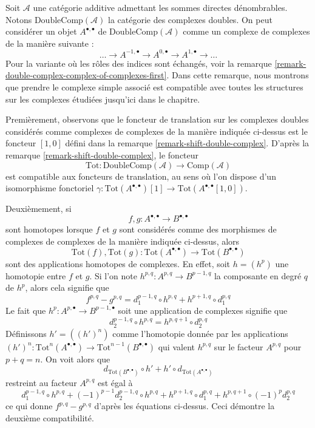 \begin{remark}
\label{remark-double-complex-complex-of-complexes-second}
Soit $\mathcal{A}$ une catégorie additive admettant les sommes directes dénombrables.
Notons $\text{DoubleComp}(\mathcal{A})$ la catégorie des complexes doubles.
On peut considérer un objet $A^{\bullet, \bullet}$ de
$\text{DoubleComp}(\mathcal{A})$ comme un complexe de complexes
de la manière suivante :
$$
\ldots \to A^{-1, \bullet} \to A^{0, \bullet} \to A^{1, \bullet} \to \ldots
$$
Pour la variante où les rôles des indices sont échangés, voir la
remarque \ref{remark-double-complex-complex-of-complexes-first}.
Dans cette remarque, nous montrons que prendre le complexe simple associé
est compatible avec toutes les structures sur les complexes étudiées
jusqu'ici dans le chapitre.

\medskip\noindent
Premièrement, observons que le foncteur de translation sur les complexes doubles considérés
comme complexes de complexes de la manière indiquée ci-dessus est le foncteur
$[1, 0]$ défini dans la remarque \ref{remark-shift-double-complex}.
D'après la remarque \ref{remark-shift-double-complex}, le foncteur
$$
\text{Tot} : \text{DoubleComp}(\mathcal{A}) \to \text{Comp}(\mathcal{A})
$$
est compatible aux foncteurs de translation, au sens où l'on dispose d'un isomorphisme
fonctoriel $\gamma : \text{Tot}(A^{\bullet, \bullet})[1] \to
\text{Tot}(A^{\bullet, \bullet}[1, 0])$.

\medskip\noindent
Deuxièmement, si
$$
f, g : A^{\bullet, \bullet} \to B^{\bullet, \bullet}
$$
sont homotopes lorsque $f$ et $g$ sont considérés comme des morphismes de complexes
de complexes de la manière indiquée ci-dessus, alors
$$
\text{Tot}(f), \text{Tot}(g) :
\text{Tot}(A^{\bullet, \bullet}) \to \text{Tot}(B^{\bullet, \bullet})
$$
sont des applications homotopes de complexes. En effet, soit $h = (h^p)$
une homotopie entre $f$ et $g$. Si l'on note
$h^{p, q} : A^{p, q} \to B^{p - 1, q}$ la composante en degré $q$ de $h^p$,
alors cela signifie que
$$
f^{p, q} - g^{p, q} = d_1^{p - 1, q} \circ h^{p, q} +
h^{p + 1, q} \circ d_1^{p, q}
$$
Le fait que $h^p : A^{p, \bullet} \to B^{p - 1, \bullet}$ soit une application de
complexes signifie que
$$
d_2^{p - 1, q} \circ h^{p, q} = h^{p, q + 1} \circ d_2^{p, q}
$$
Définissons $h' = ((h')^n)$ comme l'homotopie donnée par les applications
$(h')^n : \text{Tot}^n(A^{\bullet, \bullet}) \to
\text{Tot}^{n - 1}(B^{\bullet, \bullet})$
qui valent $h^{p, q}$ sur le facteur $A^{p, q}$ pour $p + q = n$.
On voit alors que
$$
d_{\text{Tot}(B^{\bullet, \bullet})} \circ h' +
h' \circ d_{\text{Tot}(A^{\bullet, \bullet})}
$$
restreint au facteur $A^{p, q}$ est égal à
$$
d_1^{p - 1, q} \circ h^{p, q} +
(-1)^{p - 1} d_2^{p - 1, q} \circ h^{p, q} +
h^{p + 1, q} \circ d_1^{p, q} +
h^{p, q + 1} \circ (-1)^p d_2^{p, q}
$$
ce qui donne $f^{p, q} - g^{p, q}$ d'après les équations ci-dessus.
Ceci démontre la deuxième compatibilité.


\end{remark}
